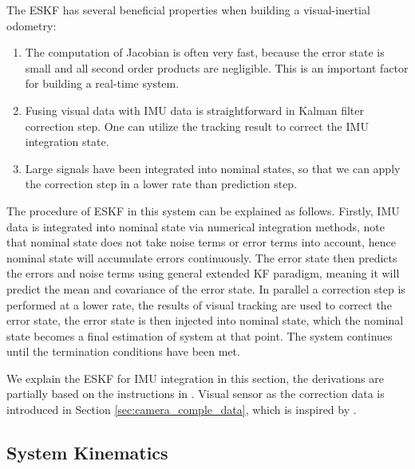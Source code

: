 The ESKF has several beneficial properties when building a visual-inertial odometry:                                                                                                                                                                                                                                                                                                              
\begin{enumerate}
	\item The computation of Jacobian is often very fast, because the error state is small and all second order products are negligible. This is an important factor for building a real-time system.
	\item Fusing visual data with IMU data is straightforward in Kalman filter correction step. One can utilize the tracking result to correct the IMU integration state.
	\item Large signals have been integrated into nominal states, so that we can apply the correction step in a lower rate than prediction step.
\end{enumerate}

The procedure of ESKF in this system can be explained as follows. Firstly, IMU data is integrated into nominal state via numerical integration methods, note that nominal state does not take noise terms or error terms into account, hence nominal state will accumulate errors continuously. The error state then predicts the errors and noise terms using general extended KF paradigm, meaning it will predict the mean and covariance of the error state. In parallel a correction step is performed at a lower rate, the results of visual tracking are used to correct the error state, the error state is then injected into nominal state, which the nominal state becomes a final estimation of system at that point. The system continues until the termination conditions have been met.

We explain the ESKF for IMU integration in this section, the derivations are partially based on the instructions in \cite{Quaternion2015Joan}. Visual sensor as the correction data is introduced in Section \ref{sec:camera_comple_data}, which is inspired by \cite{weiss2012vision}.


\subsection{System Kinematics}
\label{subsec:ESKF_IMU_sub2}

